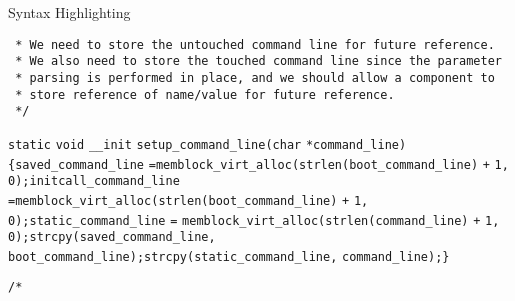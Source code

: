 \begin{frame}{Syntax Highlighting}
\begin{verbatim}
 * We need to store the untouched command line for future reference.
 * We also need to store the touched command line since the parameter
 * parsing is performed in place, and we should allow a component to
 * store reference of name/value for future reference.
 */\end{verbatim}\leavevmode\newline\color{BurntOrange}\verb$static$ \color{BurntOrange}\verb$void$ \color{Aquamarine}\verb$__init$ \color{Aquamarine}\verb$setup_command_line$\color{Fuchsia}\verb$($\color{BurntOrange}\verb$char$ \color{Goldenrod}\verb$*$\color{Aquamarine}\verb$command_line$\color{Fuchsia}\verb$)$\newline\color{Fuchsia}\verb${$\newline\tab\color{Aquamarine}\verb$saved_command_line$ \color{Fuchsia}\verb$=$\newline\tab\tab\color{Aquamarine}\verb$memblock_virt_alloc$\color{Fuchsia}\verb$($\color{Aquamarine}\verb$strlen$\color{Fuchsia}\verb$($\color{Aquamarine}\verb$boot_command_line$\color{Fuchsia}\verb$)$ \color{Goldenrod}\verb$+$ \color{ForestGreen}\verb$1$\color{Fuchsia}\verb$,$ \color{ForestGreen}\verb$0$\color{Fuchsia}\verb$)$\color{Fuchsia}\verb$;$\newline\tab\color{Aquamarine}\verb$initcall_command_line$ \color{Fuchsia}\verb$=$\newline\tab\tab\color{Aquamarine}\verb$memblock_virt_alloc$\color{Fuchsia}\verb$($\color{Aquamarine}\verb$strlen$\color{Fuchsia}\verb$($\color{Aquamarine}\verb$boot_command_line$\color{Fuchsia}\verb$)$ \color{Goldenrod}\verb$+$ \color{ForestGreen}\verb$1$\color{Fuchsia}\verb$,$ \color{ForestGreen}\verb$0$\color{Fuchsia}\verb$)$\color{Fuchsia}\verb$;$\newline\tab\color{Aquamarine}\verb$static_command_line$ \color{Fuchsia}\verb$=$ \color{Aquamarine}\verb$memblock_virt_alloc$\color{Fuchsia}\verb$($\color{Aquamarine}\verb$strlen$\color{Fuchsia}\verb$($\color{Aquamarine}\verb$command_line$\color{Fuchsia}\verb$)$ \color{Goldenrod}\verb$+$ \color{ForestGreen}\verb$1$\color{Fuchsia}\verb$,$ \color{ForestGreen}\verb$0$\color{Fuchsia}\verb$)$\color{Fuchsia}\verb$;$\newline\tab\color{Aquamarine}\verb$strcpy$\color{Fuchsia}\verb$($\color{Aquamarine}\verb$saved_command_line$\color{Fuchsia}\verb$,$ \color{Aquamarine}\verb$boot_command_line$\color{Fuchsia}\verb$)$\color{Fuchsia}\verb$;$\newline\tab\color{Aquamarine}\verb$strcpy$\color{Fuchsia}\verb$($\color{Aquamarine}\verb$static_command_line$\color{Fuchsia}\verb$,$ \color{Aquamarine}\verb$command_line$\color{Fuchsia}\verb$)$\color{Fuchsia}\verb$;$\newline\color{Fuchsia}\verb$}$\newline\newline\color{Rhodamine}\begin{verbatim}/*

\end{verbatim}
\end{frame}
